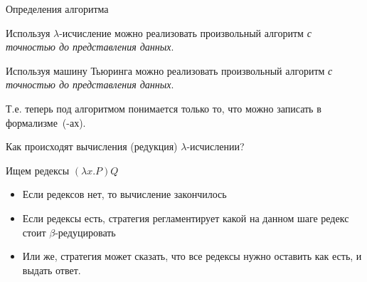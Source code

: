 \begin{frame}{Определения алгоритма}
 \begin{theorem}
  Используя $\lambda$-исчисление можно реализовать произвольный алгоритм
  \emph{с точностью до представления данных}.
\end{theorem}
\begin{theorem}
Используя машину Тьюринга можно реализовать произвольный алгоритм
\emph{с точностью до представления данных}.
\end{theorem}
\vspace{1em}
Т.е. теперь под алгоритмом понимается только то, что можно записать в формализ\-ме~(-ах).
\end{frame}

\begin{frame}{Как происходят вычисления (редукция) $\lambda$-исчислении?}
  \begin{definition}
    Ищем редексы $(\lambda x. P)Q$
    \begin{itemize}
      \item Если редексов нет, то вычисление закончилось
      \item Если редексы есть, стратегия регламентирует какой на данном шаге редекс стоит $\beta$-редуцировать
      \item Или же, стратегия может сказать, что все редексы нужно оставить как есть, и выдать ответ.
    \end{itemize}
  \end{definition}
\end{frame}

